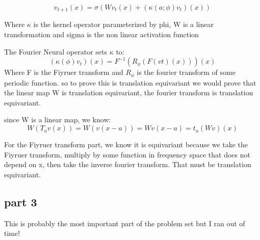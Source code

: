 \documentclass[11pt]{article}
\begin{document}
\begin{equation}
    v_{t+1}(x)=\sigma(Wv_t(x)+ (\kappa(a;\phi)v_t)(x))
\end{equation}

Where $\kappa$ is the kernel operator parameterized by phi, W is a linear transformation and sigma is the non linear activation
function

The Fourier Neural operator sets $\kappa$ to:
\begin{equation}
    (\kappa(\phi)v_t)(x)=F^{-1}(R_{\phi}(F(vt)(x)))(x)
\end{equation}
Where F is the Fiyruer transform and $R_{\phi}$ is the fourier transform of some periodic function. 
so to prove this is translation equivariant we would prove that the linear map W is translation equivariant, 
the fourier transform is translation equivariant.
\par since W is a linear map, we know:
\begin{equation}
    W(T_av(x))=W(v(x-a))=Wv(x-a)=t_a(Wv)(x)
\end{equation}

For the Fiyruer transform part, we know it is equivariant because we take the Fiyruer transform, multiply by some function in frequency space that does not depend on x, then take the inverse fourier transform. That must be translation equivariant.

\subsection{part 3}
This is probably the most important part of the problem set but I ran out of time! 
\end{document}
